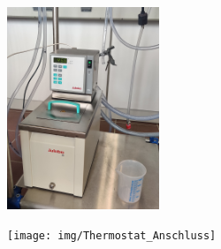 \documentclass[a4paper, 11pt, draft=false]{scrartcl}
\begin{document}
	\begin{figure}[h!]
		\begin{subfigure}[c]{0.5\textwidth}
			\centering
			\includegraphics[width=0.5\textwidth, angle=-90]{img/Thermostat}
			\captionsetup{labelformat=empty}
		\end{subfigure}
		\begin{subfigure}[c]{0.5\textwidth}
			\centering
			\texttt{[image: img/Thermostat\_Anschluss]}
			\captionsetup{labelformat=empty}
		\end{subfigure}
	\end{figure}
	\FloatBarrier
	
\end{document}
